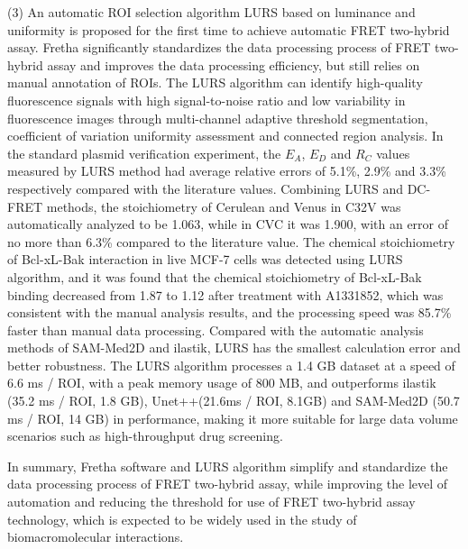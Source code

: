 \begin{eabstract}
(3) An automatic ROI selection algorithm LURS based on luminance and uniformity is proposed for the first time to achieve automatic FRET two-hybrid assay.
Fretha significantly standardizes the data processing process of FRET two-hybrid assay and improves the data processing efficiency, but still relies on manual annotation of ROIs.
The LURS algorithm can identify high-quality fluorescence signals with high signal-to-noise ratio and low variability in fluorescence images through multi-channel adaptive threshold segmentation, coefficient of variation uniformity assessment and connected region analysis.
In the standard plasmid verification experiment, the $E_{A}$, $E_{D}$ and $R_C$ values measured by LURS method had average relative errors of 5.1\%, 2.9\% and 3.3\% respectively compared with the literature values.
Combining LURS and DC-FRET methods, the stoichiometry of Cerulean and Venus in C32V was automatically analyzed to be 1.063, while in CVC it was 1.900, with an error of no more than 6.3\% compared to the literature value.
The chemical stoichiometry of Bcl-xL-Bak interaction in live MCF-7 cells was detected using LURS algorithm, and it was found that the chemical stoichiometry of Bcl-xL-Bak binding decreased from 1.87 to 1.12 after treatment with A1331852, which was consistent with the manual analysis results, and the processing speed was 85.7\% faster than manual data processing.
Compared with the automatic analysis methods of SAM-Med2D and ilastik, LURS has the smallest calculation error and better robustness.
The LURS algorithm processes a 1.4 GB dataset at a speed of 6.6 ms / ROI, with a peak memory usage of 800 MB, and outperforms ilastik (35.2 ms / ROI, 1.8 GB), Unet++(21.6ms / ROI, 8.1GB) and SAM-Med2D (50.7 ms / ROI, 14 GB) in performance, making it more suitable for large data volume scenarios such as high-throughput drug screening.

In summary, Fretha software and LURS algorithm simplify and standardize the data processing process of FRET two-hybrid assay, while improving the level of automation and reducing the threshold for use of FRET two-hybrid assay technology, which is expected to be widely used in the study of biomacromolecular interactions.
\end{eabstract}

